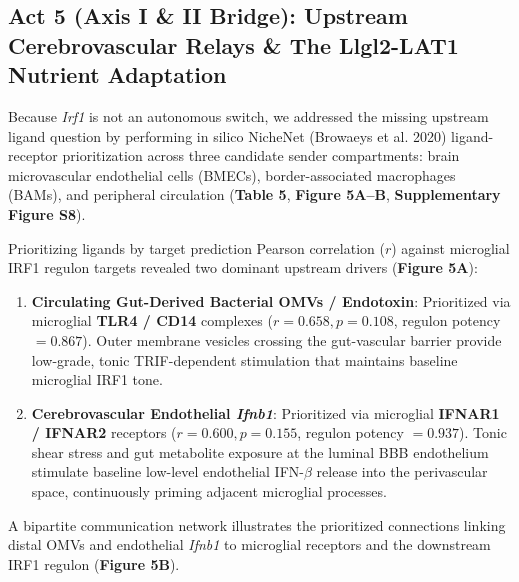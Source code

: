 \documentclass[10pt,a4paper]{article}
\begin{document}
\subsection{Act 5 (Axis I \& II Bridge): Upstream Cerebrovascular Relays \& The Llgl2-LAT1 Nutrient Adaptation}
Because \textit{Irf1} is not an autonomous switch, we addressed the missing upstream ligand question by performing in silico NicheNet (Browaeys et al. 2020)\cite{browaeys2020_39} ligand-receptor prioritization across three candidate sender compartments: brain microvascular endothelial cells (BMECs), border-associated macrophages (BAMs), and peripheral circulation (\textbf{Table 5}, \textbf{Figure 5A--B}, \textbf{Supplementary Figure S8}).

Prioritizing ligands by target prediction Pearson correlation ($r$) against microglial IRF1 regulon targets revealed two dominant upstream drivers (\textbf{Figure 5A}):
\begin{enumerate}
\item \textbf{Circulating Gut-Derived Bacterial OMVs / Endotoxin}: Prioritized via microglial \textbf{TLR4 / CD14} complexes ($r = 0.658, p = 0.108$, regulon potency $= 0.867$). Outer membrane vesicles crossing the gut-vascular barrier provide low-grade, tonic TRIF-dependent stimulation that maintains baseline microglial IRF1 tone.
\item \textbf{Cerebrovascular Endothelial \textit{Ifnb1}}: Prioritized via microglial \textbf{IFNAR1 / IFNAR2} receptors ($r = 0.600, p = 0.155$, regulon potency $= 0.937$). Tonic shear stress and gut metabolite exposure at the luminal BBB endothelium stimulate baseline low-level endothelial IFN-$\beta$ release into the perivascular space, continuously priming adjacent microglial processes.
\end{enumerate}A bipartite communication network illustrates the prioritized connections linking distal OMVs and endothelial \textit{Ifnb1} to microglial receptors and the downstream IRF1 regulon (\textbf{Figure 5B}).
\end{document}
